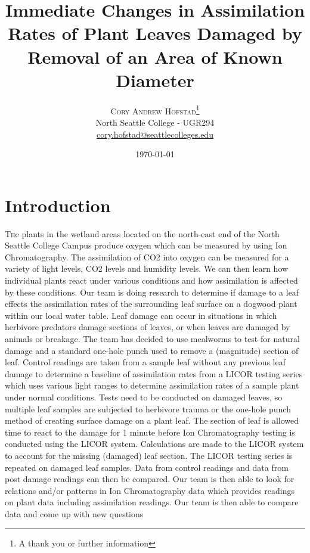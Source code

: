 \documentclass[twoside,twocolumn]{article}
\title{Immediate Changes in Assimilation Rates of Plant Leaves Damaged by Removal of an Area of Known Diameter } %
\author{%
\textsc{Cory Andrew Hofstad}\thanks{A thank you or further information} \\[1ex] %
\normalsize North Seattle College - UGR294  \\ %
\normalsize \href{mailto:cory.hofstad@seattlecolleges.edu}{cory.hofstad@seattlecolleges.edu} %
}
\date{\today} %
\begin{document}
\maketitle


\section{Introduction}


\lettrine The plants in the wetland areas located on the north-east end of the North Seattle College Campus produce oxygen which can be measured by using Ion Chromatography. The assimilation of CO2 into oxygen can be measured for a variety of light levels, CO2 levels and humidity levels. We can then learn how individual plants react under various conditions and how assimilation is affected by these conditions.
Our team is doing research to determine if damage to a leaf effects the assimilation rates of the surrounding leaf surface on a dogwood plant within our local water table. Leaf damage can occur in situations in which herbivore predators damage sections of leaves, or when leaves are damaged by animals or breakage. The team has decided to use mealworms to test for natural damage and a standard one-hole punch used to remove a (magnitude) section of leaf.
Control readings are taken from a sample leaf without any previous leaf damage to determine a baseline of assimilation rates from a LICOR testing series which uses various light ranges to determine assimilation rates of a sample plant under normal conditions.
Tests need to be conducted on damaged leaves, so multiple leaf samples are subjected to herbivore trauma or the one-hole punch method of creating surface damage on a plant leaf.
The section of leaf is allowed time to react to the damage for 1 minute before Ion Chromatography testing is conducted using the LICOR system. Calculations are made to the LICOR system to account for the missing (damaged) leaf section.
The LICOR testing series is repeated on damaged leaf samples. Data from control readings and data from post damage readings can then be compared. Our team is then able to look for relations and/or patterns in Ion Chromatography data which provides readings on plant data including assimilation readings.
Our team is then able to compare data and come up with new questions
\end{document}
